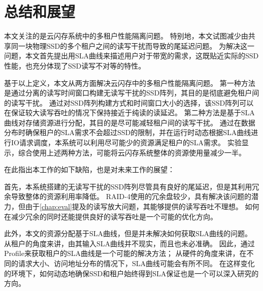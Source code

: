 
\chapter{总结和展望}

本文关注的是云闪存系统中的多租户性能隔离问题。
特别地，本文试图减少由共享同一块物理SSD的多个租户之间的读写干扰而导致的尾延迟问题。
为解决这一问题，本文首先提出用SLA曲线来描述用户对于带宽的需求，这既贴近实际的SSD性能，也充分体现了SSD读写不对等的特性。

基于以上定义，本文从两方面解决云闪存中的多租户性能隔离问题。
第一种方法是通过分离的读写时间窗口构建无读写干扰的SSD阵列，其目的是彻底避免租户间的读写干扰。
通过对SSD阵列构建方式和时间窗口大小的选择，该SSD阵列可以在保证较大读写吞吐的情况下保持接近于纯读的读延迟。
第二种方法是基于SLA曲线对存储资源进行分配，其目的是尽可能减轻租户间的读写干扰。
通过在数据分布时确保租户的SLA需求不会超过SSD的限制，并在运行时动态根据SLA曲线进行IO请求调度，本系统可以利用尽可能少的资源满足租户的SLA需求。
实验显示，综合使用上述两种方法，可能将云闪存系统整体的资源使用量减少一半。

在此指出本工作的如下缺陷，也是对未来工作的展望：

首先，本系统搭建的无读写干扰的SSD阵列尽管具有良好的尾延迟，但是其利用冗余导致整体的资源利用率降低。
RAID-4使用的冗余盘较少，具有解决该问题的潜力，但由于\autoref{chap:eval}提及的读写放大问题，其能够提供的读写吞吐不理想。
如何在减少冗余的同时还能提供良好的读写吞吐是一个可能的优化方向。

此外，本文的资源分配基于SLA曲线，但是并未解决如何获取SLA曲线的问题。
从租户的角度来讲，由其输入SLA曲线并不现实，而且也未必准确。
因此，通过Profile来获取租户的SLA曲线是一个可能的解决方法\cite{delimitrou2014quasar}；
从硬件的角度来讲，在不同的请求大小、访问地址分布的情况下，SLA曲线可能会有所不同。
在这样变化的环境下，如何动态地确保SSD和租户始终得到SLA保证也是一个可以深入研究的方向。

